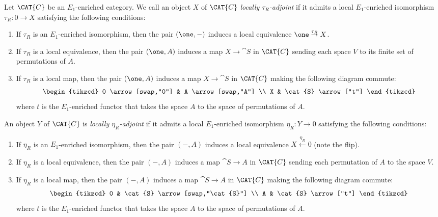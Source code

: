 \documentclass[a4paper,reqno,oneside]{article}
\begin{document}
\begin{definition}\label{defn.htp}
Let $\CAT{C}$ be an $E_1$-enriched category. We call an object $X$ of $\CAT{C}$ 
\emph{locally $\tau_R$-adjoint} if it admits a local $E_1$-enriched isomorphism $\tau_R \colon 0 \rightarrow X$
satisfying the following conditions:
\begin{enumerate}
\item If $\tau_R$ is an $E_1$-enriched isomorphism, then the pair $(\one,-)$ induces a local equivalence $\one \stackrel{\tau_R}{\rightarrow} X$.
\item If $\tau_R$ is a local equivalence, then the pair $(\one,A)$ induces a map $X \rightarrow \cat{S}$ in $\CAT{C}$ sending each space $V$ to its finite set of permutations of $A$.
\item If $\tau_R$ is a local map, then the pair $(\one,A)$ induces a map $X \rightarrow \cat{S}$ in $\CAT{C}$ making the following diagram commute:
$$\begin{tikzcd}
    0 \arrow[swap,"0"] 
     & A \arrow[swap,"A"] 
     \\
    X 
     & \cat{S}
     \arrow["t"]
\end{tikzcd}$$ 
where $t$ is the $E_1$-enriched functor that takes the space $A$ to the space of permutations of $A$.
\end{enumerate}

An object $Y$ of $\CAT{C}$ is \emph{locally $\eta_R$-adjoint} if it admits a local $E_1$-enriched 
isomorphism $\eta_R \colon Y \rightarrow 0$ satisfying the following conditions:
\begin{enumerate}
\item If $\eta_R$ is an $E_1$-enriched isomorphism, then the pair $(-,A)$ induces a local equivalence $X \stackrel{\eta_R}{\leftarrow} 0$ (note the flip).
\item If $\eta_R$ is a local equivalence, then the pair $(-,A)$ induces a map $\cat{S} \rightarrow A$ in $\CAT{C}$ sending each permutation of $A$ to the space $V$.
\item If $\eta_R$ is a local map, then the pair $(-,A)$ induces a map $\cat{S} \rightarrow A$ in $\CAT{C}$ making the following diagram commute:
$$\begin{tikzcd}
    0 
     & \cat{S} \arrow[swap,"\cat{S}"] 
     \\
    A 
     & \cat{S}
     \arrow["t"]
\end{tikzcd}$$ 
where $t$ is the $E_1$-enriched functor that takes the space $A$ to the space of permutations of $A$.
\end{enumerate}
\end{definition}
\end{document}
